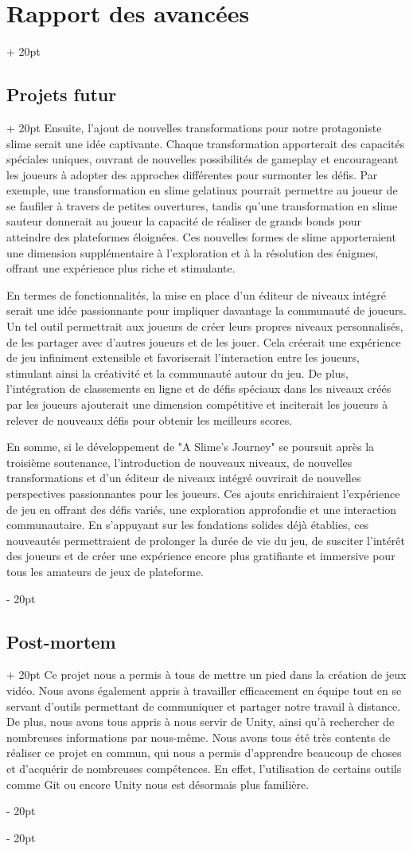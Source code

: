 \documentclass[a4paper, 12pt, twoside]{article}
\newcommand{\ind}[1][20pt]{\advance\leftskip + #1}
\newcommand{\deind}[1][20pt]{\advance\leftskip - #1}
\newenvironment{indt}[2][20pt]{#2 \par \ind[#1]}{\par \deind} %
\begin{document}
\begin{indt}{\section{Rapport des avancées}}
\begin{indt}{\subsection{Projets futur}}
            Ensuite, l'ajout de nouvelles transformations pour notre protagoniste slime serait une idée captivante. Chaque transformation apporterait des capacités spéciales uniques, ouvrant de nouvelles possibilités de gameplay et encourageant les joueurs à adopter des approches différentes pour surmonter les défis. Par exemple, une transformation en slime gelatinux pourrait permettre au joueur de se faufiler à travers de petites ouvertures, tandis qu'une transformation en slime sauteur donnerait au joueur la capacité de réaliser de grands bonds pour atteindre des plateformes éloignées. Ces nouvelles formes de slime apporteraient une dimension supplémentaire à l'exploration et à la résolution des énigmes, offrant une expérience plus riche et stimulante.

            En termes de fonctionnalités, la mise en place d'un éditeur de niveaux intégré serait une idée passionnante pour impliquer davantage la communauté de joueurs. Un tel outil permettrait aux joueurs de créer leurs propres niveaux personnalisés, de les partager avec d'autres joueurs et de les jouer. Cela créerait une expérience de jeu infiniment extensible et favoriserait l'interaction entre les joueurs, stimulant ainsi la créativité et la communauté autour du jeu. De plus, l'intégration de classements en ligne et de défis spéciaux dans les niveaux créés par les joueurs ajouterait une dimension compétitive et inciterait les joueurs à relever de nouveaux défis pour obtenir les meilleurs scores.

            En somme, si le développement de "A Slime's Journey" se poursuit après la troisième soutenance, l'introduction de nouveaux niveaux, de nouvelles transformations et d'un éditeur de niveaux intégré ouvrirait de nouvelles perspectives passionnantes pour les joueurs. Ces ajouts enrichiraient l'expérience de jeu en offrant des défis variés, une exploration approfondie et une interaction communautaire. En s'appuyant sur les fondations solides déjà établies, ces nouveautés permettraient de prolonger la durée de vie du jeu, de susciter l'intérêt des joueurs et de créer une expérience encore plus gratifiante et immersive pour tous les amateurs de jeux de plateforme.
        \end{indt}

        \begin{indt}{\subsection{Post-mortem}}
           Ce projet nous a permis à tous de mettre un pied dans la création de jeux vidéo. Nous avons également appris à travailler efficacement en équipe tout en se servant d’outils permettant de communiquer et partager notre travail à distance. De plus, nous avons tous appris à nous servir de Unity, ainsi qu’à rechercher de nombreuses informations par nous-même. Nous avons tous été très contents de réaliser ce projet en commun, qui nous a permis d’apprendre beaucoup de choses et d'acquérir de nombreuses compétences. En effet, l’utilisation de certains outils comme Git ou encore Unity nous est désormais plus familière.


\end{indt}
\end{indt}
\end{document}
